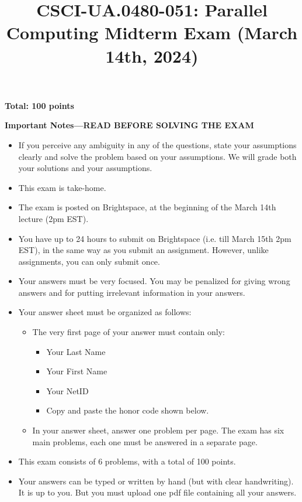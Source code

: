 \documentclass{article}
\title{CSCI-UA.0480-051: Parallel Computing Midterm Exam (March 14th, 2024)}
\author{}
\date{}
\begin{document}
\maketitle

\textbf{Total: 100 points}

\textbf{Important Notes---READ BEFORE SOLVING THE EXAM}

\begin{itemize}
    \item If you perceive any ambiguity in any of the questions, state your assumptions clearly and solve the problem based on your assumptions. We will grade both your solutions and your assumptions.
    \item This exam is take-home.
    \item The exam is posted on Brightspace, at the beginning of the March 14th lecture (2pm EST).
    \item You have up to 24 hours to submit on Brightspace (i.e. till March 15th 2pm EST), in the same way as you submit an assignment. However, unlike assignments, you can only submit once.
    \item Your answers must be very focused. You may be penalized for giving wrong answers and for putting irrelevant information in your answers.
    \item Your answer sheet must be organized as follows:
    \begin{itemize}
        \item The very first page of your answer must contain only:
        \begin{itemize}
            \item Your Last Name
            \item Your First Name
            \item Your NetID
            \item Copy and paste the honor code shown below.
        \end{itemize}
        \item In your answer sheet, answer one problem per page. The exam has six main problems, each one must be answered in a separate page.
    \end{itemize}
    \item This exam consists of 6 problems, with a total of 100 points.
    \item Your answers can be typed or written by hand (but with clear handwriting). It is up to you. But you must upload one pdf file containing all your answers.
\end{itemize}
\end{document}
